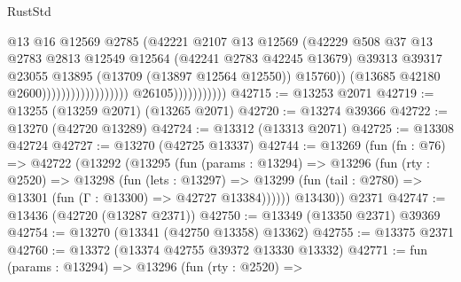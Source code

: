 \begin{lexlean}{RustStd}
\begin{coremodule}
                                                            @13
                                                            @16
                                                            @12569
                                                            @2785
                                                            (@42221
                                                              @2107
                                                              @13
                                                              @12569
                                                              (@42229
                                                                @508
                                                                @37
                                                                @13
                                                                @2783
                                                                @2813
                                                                @12549
                                                                @12564
                                                                (@42241 @2783 @42245 @13679)
                                                                @39313
                                                                @39317
                                                                @23055
                                                                @13895
                                                                (@13709 (@13897 @12564 @12550))
                                                                @15760))
                                                            (@13685 @42180 @2600))))))))))))))))))
                          @26105)))))))))))
@42715 := @13253 @2071
@42719 := @13255 (@13259 @2071) (@13265 @2071)
@42720 := @13274 @39366
@42722 := @13270 (@42720 @13289)
@42724 := @13312 (@13313 @2071)
@42725 := @13308 @42724
@42727 := @13270 (@42725 @13337)
@42744 := @13269
    (fun (fn : @76) =>
    @42722
      (@13292
        (@13295
          (fun (params : @13294) =>
          @13296
            (fun (rty : @2520) =>
            @13298
              (fun (lets : @13297) =>
              @13299 (fun (tail : @2780) => @13301 (fun (Γ : @13300) => @42727 @13384))))))
        @13430))
    @2371
@42747 := @13436 (@42720 (@13287 @2371))
@42750 := @13349 (@13350 @2371) @39369
@42754 := @13270 (@13341 (@42750 @13358) @13362)
@42755 := @13375 @2371
@42760 := @13372 (@13374 @42755 @39372 @13330 @13332)
@42771 := fun (params : @13294) =>
  @13296
    (fun (rty : @2520) =>

\end{coremodule}
\end{lexlean}
